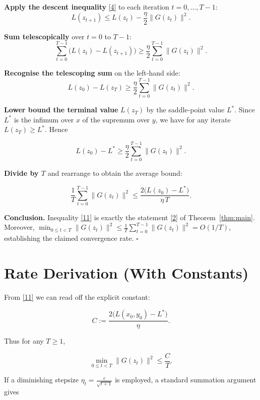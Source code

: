 \documentclass{article}
\begin{document}
\begin{enumerate}[label=\textbf{[Step \arabic*]}, leftmargin=*]
\item \textbf{Apply the descent inequality} \eqref{4} to each iteration \(t=0,\dots ,T-1\):
\[
L(z_{t+1})\le L(z_t)-\frac{\eta}{2}\|G(z_t)\|^{2}.
\tag{7}
\]

\item \textbf{Sum telescopically} over \(t=0\) to \(T-1\):
\[
\sum_{t=0}^{T-1}\bigl(L(z_t)-L(z_{t+1})\bigr)
\ge \frac{\eta}{2}\sum_{t=0}^{T-1}\|G(z_t)\|^{2}.
\tag{8}
\]

\item \textbf{Recognise the telescoping sum} on the left‑hand side:
\[
L(z_0)-L(z_T)\ge \frac{\eta}{2}\sum_{t=0}^{T-1}\|G(z_t)\|^{2}.
\tag{9}
\]

\item \textbf{Lower bound the terminal value} \(L(z_T)\) by the saddle‑point value \(L^*\).  
Since \(L^*\) is the infimum over \(x\) of the supremum over \(y\), we have for any iterate
\(L(z_T)\ge L^*\).  Hence

\[
L(z_0)-L^*\ge \frac{\eta}{2}\sum_{t=0}^{T-1}\|G(z_t)\|^{2}.
\tag{10}
\]

\item \textbf{Divide by \(T\)} and rearrange to obtain the average bound:

\[
\frac{1}{T}\sum_{t=0}^{T-1}\|G(z_t)\|^{2}
\le \frac{2\bigl(L(z_0)-L^*\bigr)}{\eta\,T}.
\tag{11}
\]

\item \textbf{Conclusion.}  Inequality \eqref{11} is exactly the statement \eqref{2} of Theorem~\ref{thm:main}.  Moreover,
\(\min_{0\le t<T}\|G(z_t)\|^{2}\le \tfrac{1}{T}\sum_{t=0}^{T-1}\|G(z_t)\|^{2}=O(1/T)\), establishing the claimed convergence rate. \hfill\(\square\)
\end{enumerate}

\section*{Rate Derivation (With Constants)}
From \eqref{11} we can read off the explicit constant:

\[
C:=\frac{2\bigl(L(x_0,y_0)-L^*\bigr)}{\eta}.
\]

Thus for any \(T\ge1\),

\[
\min_{0\le t<T}\|G(z_t)\|^{2}\le \frac{C}{T}.
\]

If a diminishing stepsize \(\eta_t=\frac{c}{\sqrt{t+1}}\) is employed, a standard summation argument gives  
\end{document}
